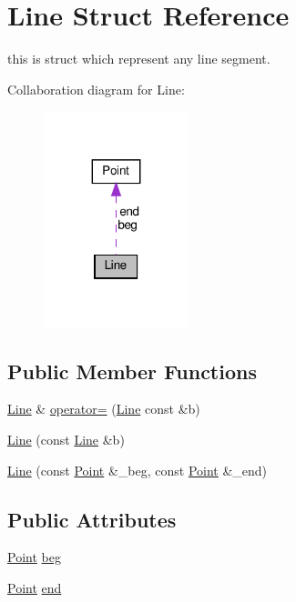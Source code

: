 \hypertarget{struct_line}{}\section{Line Struct Reference}
\label{struct_line}


this is struct which represent any line segment.  




Collaboration diagram for Line\+:
\nopagebreak
\begin{figure}[H]
\begin{center}
\leavevmode
\includegraphics[width=119pt]{struct_line__coll__graph}
\end{center}
\end{figure}
\subsection*{Public Member Functions}
\begin{DoxyCompactItemize}
\item 
\hyperlink{struct_line}{Line} \& \hyperlink{struct_line_a70001f8a33928acfc16bd9d362d57aad}{operator=} (\hyperlink{struct_line}{Line} const \&b)
\item 
\hyperlink{struct_line_a549d53aa564e20ba316c241f4938254b}{Line} (const \hyperlink{struct_line}{Line} \&b)
\item 
\hyperlink{struct_line_acd6e6638a77890435f82abb1e666dd25}{Line} (const \hyperlink{struct_point}{Point} \&\+\_\+beg, const \hyperlink{struct_point}{Point} \&\+\_\+end)
\end{DoxyCompactItemize}
\subsection*{Public Attributes}
\begin{DoxyCompactItemize}
\item 
\hyperlink{struct_point}{Point} \hyperlink{struct_line_a1a2e587cf1378a7cb7eb66a80065f226}{beg}
\item 
\hyperlink{struct_point}{Point} \hyperlink{struct_line_afca8cb662b46ae1724b7c38c3eab2069}{end}
\end{DoxyCompactItemize}


